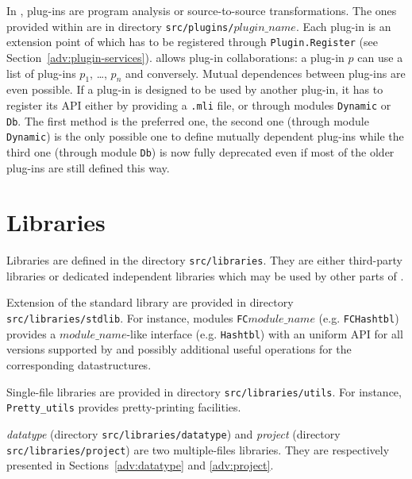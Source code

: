 In \framac, plug-ins are program analysis or source-to-source
transformations. The ones provided within \framac are in directory
\texttt{src/plugins/$plugin\_name$}. Each plug-in is an extension point of \framac which
has to be registered through \texttt{Plugin.Register}
(see Section~\ref{adv:plugin-services}). \framac allows plug-in collaborations:
a plug-in $p$ can use a list of plug-ins $p_1$, \dots, $p_n$ and
conversely. Mutual dependences between plug-ins are even possible. If a plug-in
is designed to be used by another plug-in, it has to register its API either by
providing a \texttt{.mli} file, or through modules
\texttt{Dynamic} or \texttt{Db}. The first method
is the preferred one, the second one (through module \texttt{Dynamic}) is the
only possible one to define mutually dependent plug-ins while the third one
(through module \texttt{Db}) is now fully deprecated even if most of the older
\framac plug-ins are still defined this way.


\section{Libraries}\label{archi:libraries}

Libraries are defined in the directory \texttt{src/libraries}. They are either
third-party libraries or dedicated independent libraries which may be used by
other parts of \framac.

Extension of the \caml standard library are provided in directory
\texttt{src/libraries/stdlib}. For instance, modules \texttt{FC$module\_name$}
(e.g. \texttt{FCHashtbl}) provides a
\texttt{$module\_name$}-like interface (e.g. \texttt{Hashtbl}) with an uniform
API for all \ocaml versions supported by \framac and possibly additional useful
operations for the corresponding datastructures.

Single-file libraries are provided in directory
\texttt{src/libraries/utils}. For instance,
\texttt{Pretty\_utils} provides pretty-printing
facilities.

\emph{datatype} (directory \texttt{src/libraries/datatype}) and \emph{project}
(directory \texttt{src/libraries/project}) are two multiple-files
libraries. They are respectively presented in Sections~\ref{adv:datatype} and
\ref{adv:project}.



